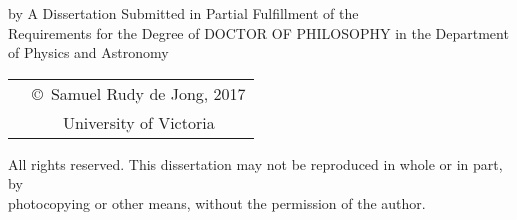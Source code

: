 \pagebreak
{
\centering
\thesistitle
\tpbreak
by
\tpbreak
\nameanddegrees
\tpbreak
A Dissertation Submitted in Partial Fulfillment of the \\
Requirements for the Degree of
\tpbreak
DOCTOR OF PHILOSOPHY
\tpbreak
in the Department of Physics and Astronomy\\
\vfill
\begin{tabular}{cc}
& \copyright\ Samuel Rudy de Jong, 2017\\
&  University of Victoria
\end{tabular}
\tpbreak
All rights reserved. This dissertation may not be reproduced in whole or in part, by \\
\hfill photocopying or other means, without the permission of the author. 
\hfill
}
\pagebreak
